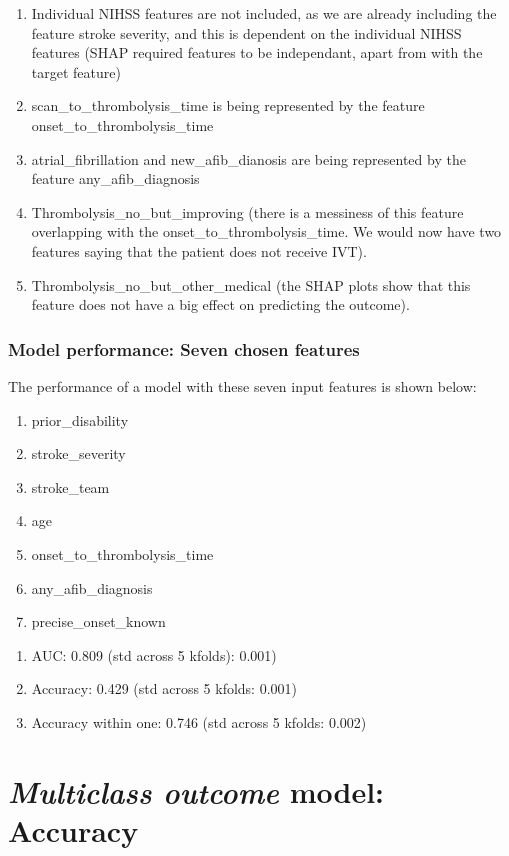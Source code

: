\begin{enumerate}
    \item Individual NIHSS features are not included, as we are already including the feature stroke severity, and this is dependent on the individual NIHSS features (SHAP required features to be independant, apart from with the target feature)
    \item scan\_to\_thrombolysis\_time is being represented by the feature onset\_to\_thrombolysis\_time
    \item atrial\_fibrillation and new\_afib\_dianosis are being represented by the feature any\_afib\_diagnosis
    \item Thrombolysis\_no\_but\_improving (there is a messiness of this feature overlapping with the onset\_to\_thrombolysis\_time. We would now have two features saying that the patient does not receive IVT).
    \item Thrombolysis\_no\_but\_other\_medical (the SHAP plots show that this feature does not have a big effect on predicting the outcome).
\end{enumerate}

\subsubsection{Model performance: Seven chosen features}

The performance of a model with these seven input features is shown below:
\begin{enumerate}
    \item prior\_disability
    \item stroke\_severity
    \item stroke\_team
    \item age
    \item onset\_to\_thrombolysis\_time
    \item any\_afib\_diagnosis
    \item precise\_onset\_known
\end{enumerate}

\begin{enumerate}
    \item AUC: 0.809 (std across 5 kfolds): 0.001)
    \item Accuracy: 0.429 (std across 5 kfolds: 0.001)
    \item Accuracy within one: 0.746 (std across 5 kfolds: 0.002)
\end{enumerate}

\section{\textit{Multiclass outcome} model: Accuracy}

